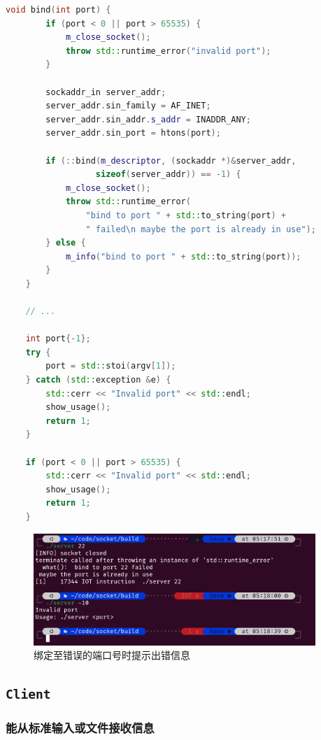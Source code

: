 \documentclass{article}
\begin{document}
\begin{lstlisting}[language=C++]
    void bind(int port) {
        if (port < 0 || port > 65535) {
            m_close_socket();
            throw std::runtime_error("invalid port");
        }

        sockaddr_in server_addr;
        server_addr.sin_family = AF_INET;
        server_addr.sin_addr.s_addr = INADDR_ANY;
        server_addr.sin_port = htons(port);

        if (::bind(m_descriptor, (sockaddr *)&server_addr,
                  sizeof(server_addr)) == -1) {
            m_close_socket();
            throw std::runtime_error(
                "bind to port " + std::to_string(port) +
                " failed\n maybe the port is already in use");
        } else {
            m_info("bind to port " + std::to_string(port));
        }
    }

    // ...

    int port{-1};
    try {
        port = std::stoi(argv[1]);
    } catch (std::exception &e) {
        std::cerr << "Invalid port" << std::endl;
        show_usage();
        return 1;
    }

    if (port < 0 || port > 65535) {
        std::cerr << "Invalid port" << std::endl;
        show_usage();
        return 1;
    }
\end{lstlisting}

\begin{figure}[H]
    \centering
    \includegraphics[width=0.95\textwidth]{img/3.png}
    \caption{绑定至错误的端口号时提示出错信息}
\end{figure}

\subsection{\texttt{Client}}

\subsubsection{能从标准输入或文件接收信息}
\end{document}
